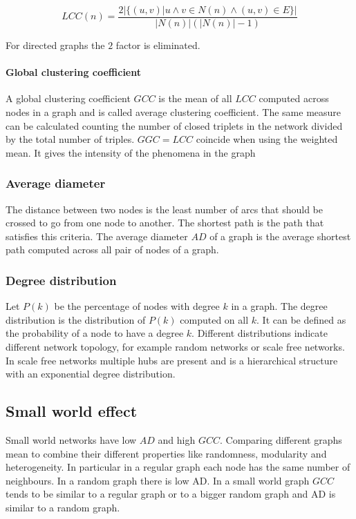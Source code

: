 			$$LCC(n) = \frac{2|\{(u,v)|u\land v\in N(n)\land (u,v)\in E\}|}{|N(n)|(|N(n)|-1)}$$

			For directed graphs the $2$ factor is eliminated.

			\paragraph{Global clustering coefficient}
			A global clustering coefficient $GCC$ is the mean of all $LCC$ computed across nodes in a graph and is called average clustering coefficient.
			The same measure can be calculated counting the number of closed triplets in the network divided by the total number of triples.
			$GGC=LCC$ coincide when using the weighted mean.
			It gives the intensity of the phenomena in the graph

		\subsubsection{Average diameter}
		The distance between two nodes is the least number of arcs that should be crossed to go from one node to another.
		The shortest path is the path that satisfies this criteria.
		The average diameter $AD$ of a graph is the average shortest path computed across all pair of nodes of a graph.

		\subsubsection{Degree distribution}
		Let $P(k)$ be the percentage of nodes with degree $k$ in a graph.
		The degree distribution is the distribution of $P(k)$ computed on all $k$.
		It can be defined as the probability of a node to have a degree $k$.
		Different distributions indicate different network topology, for example random networks or scale free networks.
		In scale free networks multiple hubs are present and is a hierarchical structure with an exponential degree distribution.

	\subsection{Small world effect}
	Small world networks have low $AD$ and high $GCC$.
	Comparing different graphs mean to combine their different properties like randomness, modularity and heterogeneity.
	In particular in a regular graph each node has the same number of neighbours.
	In a random graph there is low AD.
	In a small world graph $GCC$ tends to be similar to a regular graph or to a bigger random graph and AD is similar to a random graph.
